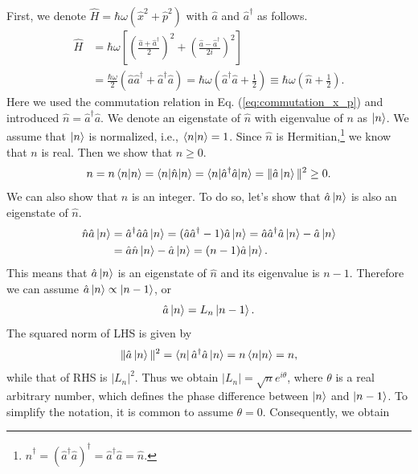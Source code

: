 \documentclass{book}
\begin{document}
First, we denote $\hat H = \hbar \omega (\hat x^2 + \hat p^2)$ with $\hat a$ and $\hat a^\dagger$ as follows.
\begin{equation}
\begin{aligned}
  \hat H &= \hbar \omega \left[\left(\frac {\hat a + \hat a^\dagger}{2}\right)^2 + \left(\frac {\hat a - \hat a^\dagger}{2i}\right)^2\right]\\
  &= \frac{\hbar \omega }{2}(\hat a\hat a^\dagger + \hat a^\dagger \hat a) = \hbar \omega \left(\hat a^\dagger \hat a + \frac 1 2\right) \equiv \hbar\omega \left(\hat n + \frac 1 2\right).
\end{aligned}
\end{equation}
Here we used the commutation relation in Eq. (\ref{eq:commutation_x_p}) and introduced $\hat n = \hat a^\dagger \hat a$. We denote an eigenstate of $\hat n$ with eigenvalue of $n$ as $\ket n$. We assume that $\ket n$ is normalized, i.e., $\braket{n|n} = 1$. Since $\hat n$ is Hermitian,\footnote{$\hat n^\dagger = (\hat a^\dagger \hat a)^\dagger = \hat a^\dagger \hat a = \hat n$.} we know that $n$ is real. Then we show that $n\geq0$.
\begin{equation}
  n = n \braket {n|n} = \braket{n|\hat n|n} = \braket {n|\hat a^\dagger \hat a|n} = \|\hat a\ket n\|^2\geq0.
  \label{eq:n_nonnegative}
\end{equation}
We can also show that $n$ is an integer. To do so, let's show that $\hat a\ket n$ is also an eigenstate of $\hat n$.
\begin{equation}
\begin{aligned}
  \hat n \hat a \ket n &= \hat a^\dagger \hat a \hat a \ket n = (\hat a\hat a^\dagger - 1)\hat a \ket n = \hat a \hat a^\dagger \hat a \ket n - \hat a \ket n \\ &= \hat a \hat n \ket n - \hat a \ket n = (n - 1)\hat a \ket n.
\end{aligned}
\end{equation}
This means that $\hat a \ket n$ is an eigenstate of $\hat n$ and its eigenvalue is $n-1$. Therefore we can assume $\hat a\ket n \propto \ket {n-1}$, or 
\begin{equation}
  \hat a\ket n = L_n\ket{n-1}.
\end{equation}
The squared norm of LHS is given by
\begin{equation}
  \| \hat a \ket n\|^2 = \bra n \hat a^\dagger \hat a \ket n = n\braket{n|n} = n,
\end{equation}
while that of RHS is $|L_n|^2$. Thus we obtain $|L_n| = \sqrt n e^{i\theta}$, where $\theta$ is a real arbitrary number, which defines the phase difference between $\ket n$ and $\ket {n-1}$. To simplify the notation, it is common to assume $\theta = 0$. Consequently, we obtain
\end{document}
